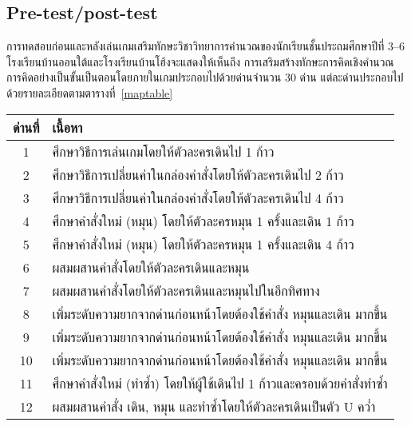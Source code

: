 \subsection{Pre-test/post-test}
การทดสอบก่อนและหลังเล่นเกมเสริมทักษะวิชาวิทยาการคำนวณของนักเรียนชั้นประถมศึกษาปีที่ 3--6 โรงเรียนบ้านออนใต้และโรงเรียนบ้านโฮ้งจะแสดงให้เห็นถึง
การเสริมสร้างทักษะการคิดเชิงคำนวณ การคิดอย่างเป็นขั้นเป็นตอนโดยภายในเกมประกอบไปด้วยด่านจำนวน 30 ด่าน
แต่ละด่านประกอบไปด้วยรายละเอียดตามตารางที่~\ref{maptable}
\begin{center}
    \begin{table}
        \begin{center}
            \begin{tabularx}{\textwidth}{|c | X|} 
             \hline
             ด่านที่ & เนื้อหา\\ [0.5ex] 
             \hline\hline
             1 &  ศึกษาวิธีการเล่นเกมโดยให้ตัวละครเดินไป 1 ก้าว \\ 
             \hline
             2 &  ศึกษาวิธีการเปลี่ยนค่าในกล่องคำสั่งโดยให้ตัวละครเดินไป 2 ก้าว \\ 
             \hline
             3 &  ศึกษาวิธีการเปลี่ยนค่าในกล่องคำสั่งโดยให้ตัวละครเดินไป 4 ก้าว \\ 
             \hline
             4 &  ศึกษาคำสั่งใหม่ (หมุน) โดยให้ตัวละครหมุน 1 ครั้งและเดิน 1 ก้าว \\ 
             \hline
             5 &  ศึกษาคำสั่งใหม่ (หมุน) โดยให้ตัวละครหมุน 1 ครั้งและเดิน 4 ก้าว \\ 
             \hline
             6 &  ผสมผสานคำสั่งโดยให้ตัวละครเดินและหมุน \\ 
             \hline
             7 &  ผสมผสานคำสั่งโดยให้ตัวละครเดินและหมุนไปในอีกทิศทาง \\ 
             \hline
             8 &  เพิ่มระดับความยากจากด่านก่อนหน้าโดยต้องใช้คำสั่ง หมุนและเดิน มากขึ้น \\ 
             \hline
             9 &  เพิ่มระดับความยากจากด่านก่อนหน้าโดยต้องใช้คำสั่ง หมุนและเดิน มากขึ้น \\ 
             \hline
             10 &  เพิ่มระดับความยากจากด่านก่อนหน้าโดยต้องใช้คำสั่ง หมุนและเดิน มากขึ้น \\ 
             \hline
             11 &  ศึกษาคำสั่งใหม่ (ทำซ้ำ) โดยให้ผู้ใช้เดินไป 1 ก้าวและครอบด้วยคำสั่งทำซ้ำ \\ 
             \hline
             12 &  ผสมผสานคำสั่ง เดิน, หมุน และทำซ้ำโดยให้ตัวละครเดินเป็นตัว U คว่ำ \\ 

\end{tabularx}
\end{center}
\end{table}
\end{center}
